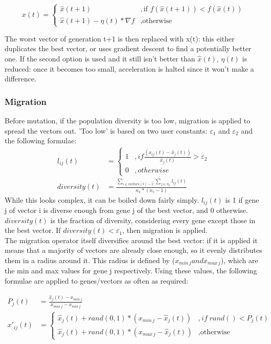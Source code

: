 \begin{equation}
    x(t) = 
    \begin{cases}
        \hat{x}(t+1) &, \text{if $f(\hat{x}(t+1)) < f(\hat{x}(t))$} \\
        \hat{x}(t+1) - \eta(t)*\nabla f  &,\text{otherwise}
    \end{cases}
\end{equation}

The worst vector of generation t+1 is then replaced with x(t): this either duplicates the best vector, or uses gradient descent to find a potentially better one. If the second option is used and it still isn't better than $\hat{x}(t)$, $\eta(t)$ is reduced: once it becomes too small, acceleration is halted since it won't make a difference. 
\newpage
\subsubsection{Migration}
Before mutation, if the population diversity is too low, migration is applied to spread the vectors out. 'Too low' is based on two user constants: $\varepsilon_1$ and $\varepsilon_2$ and the following formulae:
\begin{align}
    l_{ij}(t) &= 
    \begin{cases}
        1 &, if \frac{(x_{ij}(t) - \hat{x}_j(t))}{\hat{x}_j(t)} > \varepsilon_2 \\
        0 &, otherwise
    \end{cases} \\
    diversity(t) &= \frac{\sum_{i\in vectors(t)-\hat{x}} \sum_{j \in n_x} l_{ij}(t)}{n_x * (n_s-1)}
\end{align}
While this looks complex, it can be boiled down fairly simply. $l_{ij}(t)$ is 1 if gene j of vector i is diverse enough from gene j of the best vector, and 0 otherwise. $diversity(t)$ is the fraction of diversity, considering every gene except those in the best vector. If \(diversity(t) < \varepsilon_1\), then migration is applied.\\
The migration operator itself diversifies around the best vector: if it is applied it means that a majority of vectors are already close enough, so it evenly distributes them in a radius around it. This radius is defined by ($x_{min\, j} and x_{max\, j}$), which are the min and max values for gene j respectively. Using these values, the following formulae are applied to genes/vectors as often as required:

\begin{align}
    P_j(t) &= \frac{\hat{x}_j(t) - x_{min\, j}}{x_{max\, j} - x_{min\, j}} \nonumber \\
    x'_{ij}(t) &= 
    \begin{cases}
        \hat{x}_j(t) + rand(0,1) * (x_{min\, j} - \hat{x}_j(t)) &, if\; rand() < P_j(t) \\
        \hat{x}_j(t) + rand(0,1) * (x_{max\, j} - \hat{x}_j(t)) &, \text{otherwise}
    \end{cases}
\end{align}

